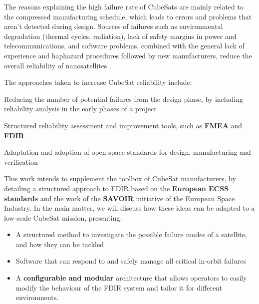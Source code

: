 \documentclass[a4paper,nobib]{tufte-book}
\begin{document}
The reasons explaining the high failure rate of CubeSats are mainly related to the compressed manufacturing schedule, which leads to errors and problems that aren't detected during design. Sources of failures such as environmental degradation (thermal cycles, radiation), lack of safety margins in power and telecommunications, and software problems, combined with the general lack of experience and haphazard procedures followed by new manufacturers, reduce the overall reliability of nanosatellites \autocite{swartwout_cubesat_mission_2019,langer_reliability_estimation_2017}.

The approaches taken to increase CubeSat reliability include:
\begin{compactitem}
	\item Reducing the number of potential failures from the design phase, by including reliability analysis in the early phases of a project
	\item Structured reliability assessment and improvement tools, such as \textbf{\acf{FMEA}} and \textbf{\acf{FDIR}} \autocite{faure_lean_satellites_2017,menchinelli_reliability_engineering_2018}
	\item Adaptation and adoption of open space standards for design, manufacturing and verification
\end{compactitem}


This work intends to supplement the toolbox of CubeSat manufacturers, by detailing a structured approach to \ac{FDIR} based on the \textbf{European \acs{ECSS} standards} and the work of the \textbf{\acs{SAVOIR}} initiative  of the European Space Industry. In the main matter, we will discuss how these ideas can be adapted to a low-scale CubeSat mission, presenting:
\begin{itemize}
	\item A structured method to investigate the possible failure modes of a satellite, and how they can be tackled
	\item Software that can respond to and safely manage all critical in-orbit failures
	\item A \textbf{configurable and modular} architecture that allows operators to easily modify the behaviour of the \acs{FDIR} system and tailor it for different environments.
\end{itemize}
\end{document}

